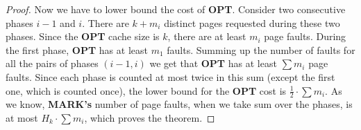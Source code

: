 \begin{proof}
Now we have to lower bound the cost of \textbf{OPT}. Consider two consecutive 
phases $i-1$ and $i$. There are $k + m_i$ distinct pages requested during these two 
phases. Since the \textbf{OPT} cache size is $k$, there are at least $m_i$ page faults. 
During the first phase, \textbf{OPT} has at least $m_1$ faults. Summing up the 
number of faults for all
the pairs of phases $(i-1, i)$ we get that \textbf{OPT} has at least $\sum m_i$ page faults. Since each phase 
is counted at most twice in this sum
(except the first one, which is counted once), the lower bound for the 
\textbf{OPT} cost is $\frac{1}{2} \cdot \sum m_i$. As we know, \textbf{MARK's} 
number of page faults, when we take sum over the phases, is at most $H_k \cdot \sum 
m_i$, which proves the theorem.
\end{proof}
